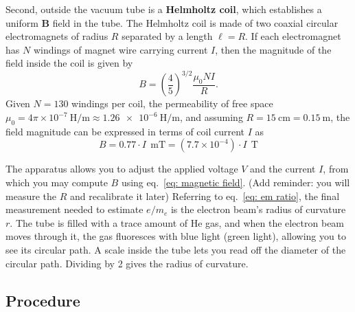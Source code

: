 \documentclass[addpoints]{physlabs}
\begin{document}
\begin{labsection}
\begin{experiment}
    Second, outside the vacuum tube is a \textbf{Helmholtz coil}, which establishes a uniform $\mathbf{B}$ field in the tube. The Helmholtz coil is made of two coaxial circular electromagnets of radius $R$ separated by a length $\ell=R$. If each electromagnet has $N$ windings of magnet wire carrying current $I$, then the magnitude of the field inside the coil is given by
    \begin{equation}\label{eq: field magnitude}
        B = \left(\frac{4}{5}\right)^{3/2} \frac{\mu_0 NI}{R}.
    \end{equation}
    Given $N=130$ windings per coil, the permeability of free space $\mu_0=4\pi\times10^{-7}~\text{H/m} \approx \qty{1.26e-6}{\henry/\meter}$, and assuming $R=\qty{15}{\centi\meter}=\qty{0.15}{\meter}$, the field magnitude can be expressed in terms of coil current $I$ as
    \begin{equation}\label{eq: magnetic field}
        B = 0.77\cdot I~\qty{}{\milli\tesla}
          = (7.7\times10^{-4})\cdot I~\qty{}{\tesla}
    \end{equation}
    

    The apparatus allows you to adjust the applied voltage $V$ and the current $I$, from which you may compute $B$ using eq.~\ref{eq: magnetic field}.{\color{red} (Add reminder: you will measure the $R$ and recalibrate it later)} Referring to eq.~\ref{eq: em ratio}, the final measurement needed to estimate $e/m_e$ is the electron beam's radius of curvature $r$. The tube is filled with a trace amount of He gas, and when the electron beam moves through it, the gas fluoresces with blue light {\color{red} (green light)}, allowing you to see its circular path. A scale inside the tube lets you read off the diameter of the circular path. Dividing by 2 gives the radius of curvature.

    \subsection*{Procedure}


\end{experiment}
\end{labsection}
\end{document}
